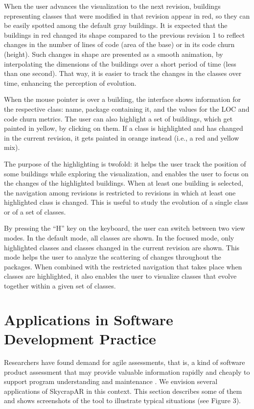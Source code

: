 When the user advances the visualization to the next revision, buildings representing classes that were modified in that revision appear in red, so they can be easily spotted among the default gray buildings. It is expected that the buildings in red changed its shape compared to the previous revision 1 to reflect changes in the number of lines of code (area of the base) or in its code churn (height). Such changes in shape are presented as a smooth animation, by interpolating the dimensions of the buildings over a short period of time (less than one second). That way, it is easier to track the changes in the classes over time, enhancing the perception of evolution.

When the mouse pointer is over a building, the interface shows information for the respective class: name, package containing it, and the values for the LOC and code churn metrics. The user can also highlight a set of buildings, which get painted in yellow, by clicking on them. If a class is highlighted and has changed in the current revision, it gets painted in orange instead (i.e., a red and yellow mix). 

The purpose of the highlighting is twofold: it helps the user track the position of some buildings while exploring the visualization, and enables the user to focus on the changes of the highlighted buildings. When at least one building is selected, the navigation among revisions is restricted to revisions in which at least one highlighted class is changed. This is useful to study the evolution of a single class or of a set of classes.

By pressing the ``H'' key on the keyboard, the user can switch between two view modes. In the default mode, all classes are shown. In the focused mode, only highlighted classes and classes changed in the current revision are shown. This mode helps the user to analyze the scattering of changes throughout the packages. When combined with the restricted navigation that takes place when classes are highlighted, it also enables the user to visualize classes that evolve together within a given set of classes.

\section{Applications in Software Development Practice} \label{sec:applications}

Researchers have found demand for agile assessments, that is, a kind of software product assessment that may provide valuable information rapidly and cheaply to support program understanding and maintenance \cite{nierstrasz:2012}. We envision several applications of SkycrapAR in this context. This section describes some of them and shows screenshots of the tool to illustrate typical situations (see Figure 3).

